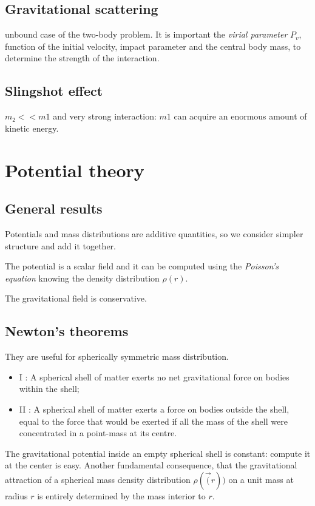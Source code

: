 \documentclass[a4paper,12pt]{article}
\begin{document}
\subsection{Gravitational scattering} 
unbound case of the two-body problem. It is important the \textit{virial parameter} $P_v$, function of the initial velocity, impact parameter and the central body mass, to determine the strength of the interaction. 


\subsection{Slingshot effect}
$m_2<<m1$ and very strong interaction: $m1$ can acquire an enormous amount of kinetic energy.



\section{Potential theory}
\subsection{General results}
Potentials and mass distributions are additive quantities, so we consider simpler structure and add it together.

The potential is a scalar field and it can be computed using the \textit{Poisson's equation} knowing the density distribution $\rho(r)$.

The gravitational field is conservative. 


\subsection{Newton's theorems}
They are useful for spherically symmetric mass distribution.

\begin{itemize}
    \item I :  A spherical shell of matter exerts no net gravitational force on bodies within the shell;

    \item II : A spherical shell of matter exerts a force on bodies outside the shell, equal to the force that would be exerted
if all the mass of the shell were concentrated in a point-mass at its centre.
 
\end{itemize}


The gravitational potential inside an empty spherical shell is constant: compute it at the center is easy. 
Another fundamental consequence, that the gravitational attraction of a spherical mass density distribution $\rho(\vec(r))$ on a unit mass at radius $r$ is entirely determined by the mass interior to $r$.
\end{document}
